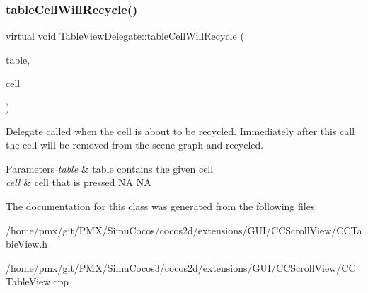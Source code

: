 \subsubsection{\texorpdfstring{table\+Cell\+Will\+Recycle()}{tableCellWillRecycle()}\hspace{0.1cm}{\footnotesize\ttfamily [2/2]}}
{\footnotesize\ttfamily virtual void Table\+View\+Delegate\+::table\+Cell\+Will\+Recycle (\begin{DoxyParamCaption}\item[{\hyperlink{classTableView}{Table\+View} $\ast$}]{table,  }\item[{\hyperlink{classTableViewCell}{Table\+View\+Cell} $\ast$}]{cell }\end{DoxyParamCaption})\hspace{0.3cm}{\ttfamily [virtual]}}

Delegate called when the cell is about to be recycled. Immediately after this call the cell will be removed from the scene graph and recycled.


\begin{DoxyParams}{Parameters}
{\em table} & table contains the given cell \\
\hline
{\em cell} & cell that is pressed  NA  NA \\
\hline
\end{DoxyParams}


The documentation for this class was generated from the following files\+:\begin{DoxyCompactItemize}
\item 
/home/pmx/git/\+P\+M\+X/\+Simu\+Cocos/cocos2d/extensions/\+G\+U\+I/\+C\+C\+Scroll\+View/C\+C\+Table\+View.\+h\item 
/home/pmx/git/\+P\+M\+X/\+Simu\+Cocos3/cocos2d/extensions/\+G\+U\+I/\+C\+C\+Scroll\+View/C\+C\+Table\+View.\+cpp\end{DoxyCompactItemize}
